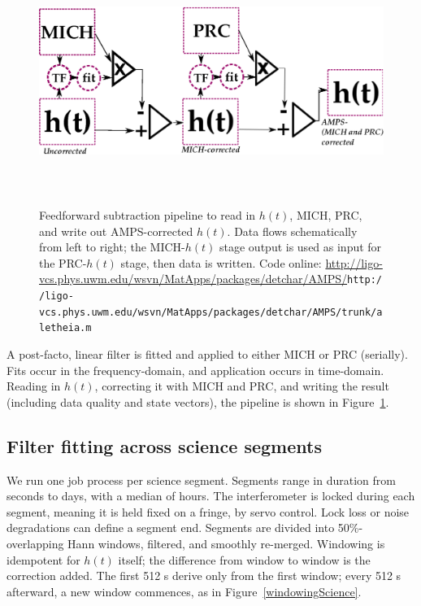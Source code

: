 \begin{figure}
\begin{center}
\includegraphics[height=80mm,width=150mm]{figure9.eps}
\caption{Feedforward subtraction pipeline to read in $h(t)$, MICH, PRC, and write out AMPS-corrected $h(t)$. Data flows schematically from left to right; the MICH-$h(t)$ stage output is used as input for the PRC-$h(t)$ stage, then data is written. Code online: \url{http://ligo-vcs.phys.uwm.edu/wsvn/MatApps/packages/detchar/AMPS/}{\texttt{http://ligo-vcs.phys.uwm.edu/wsvn/MatApps/packages/detchar/AMPS/}}\newline \texttt{trunk/aletheia.m}}
\label{pipelineGraph}
\end{center}
\end{figure}    

A post-facto, linear filter is fitted and applied to either MICH or PRC (serially). Fits occur in the frequency-domain, and application occurs in time-domain. Reading in $h(t)$, correcting it with MICH and PRC, and writing the result (including data quality and state vectors), the pipeline is shown in Figure~\ref{pipelineGraph}. 


        \subsection{Filter fitting across science segments}
        \label{filter_fitting-out-of-loop}

We run one job process per science segment. Segments range in duration from seconds to days, with a median of hours. The interferometer is locked during each segment, meaning it is held fixed on a fringe, by servo control. Lock loss or noise degradations can define a segment end. Segments are divided into 50\%-overlapping Hann windows, filtered, and smoothly re-merged. Windowing is idempotent for $h(t)$ itself; the difference from window to window is the correction added. The first 512 s derive only from the first window; every 512 s afterward, a new window commences, as in Figure~\ref{windowingScience}.

